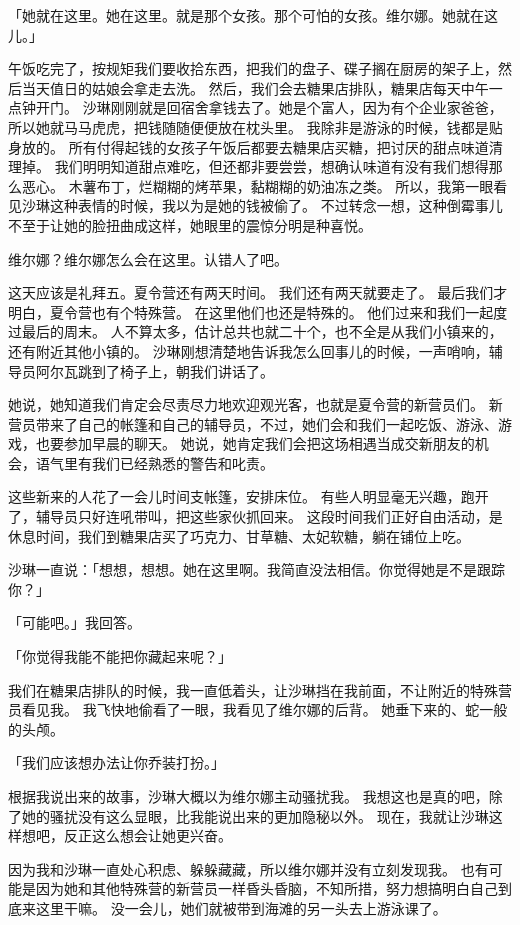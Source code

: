 \documentclass[UTF8]{ctexart}
\begin{document}
「她就在这里。她在这里。就是那个女孩。那个可怕的女孩。维尔娜。她就在这儿。」

午饭吃完了，按规矩我们要收拾东西，把我们的盘子、碟子搁在厨房的架子上，然后当天值日的姑娘会拿走去洗。
然后，我们会去糖果店排队，糖果店每天中午一点钟开门。
沙琳刚刚就是回宿舍拿钱去了。她是个富人，因为有个企业家爸爸，所以她就马马虎虎，把钱随随便便放在枕头里。
我除非是游泳的时候，钱都是贴身放的。
所有付得起钱的女孩子午饭后都要去糖果店买糖，把讨厌的甜点味道清理掉。
我们明明知道甜点难吃，但还都非要尝尝，想确认味道有没有我们想得那么恶心。
木薯布丁，烂糊糊的烤苹果，黏糊糊的奶油冻之类。
所以，我第一眼看见沙琳这种表情的时候，我以为是她的钱被偷了。
不过转念一想，这种倒霉事儿不至于让她的脸扭曲成这样，她眼里的震惊分明是种喜悦。

维尔娜？维尔娜怎么会在这里。认错人了吧。

这天应该是礼拜五。夏令营还有两天时间。
我们还有两天就要走了。
最后我们才明白，夏令营也有个特殊营。
在这里他们也还是特殊的。
他们过来和我们一起度过最后的周末。
人不算太多，估计总共也就二十个，也不全是从我们小镇来的，还有附近其他小镇的。
沙琳刚想清楚地告诉我怎么回事儿的时候，一声哨响，辅导员阿尔瓦跳到了椅子上，朝我们讲话了。

她说，她知道我们肯定会尽责尽力地欢迎观光客，也就是夏令营的新营员们。
新营员带来了自己的帐篷和自己的辅导员，不过，她们会和我们一起吃饭、游泳、游戏，也要参加早晨的聊天。
她说，她肯定我们会把这场相遇当成交新朋友的机会，语气里有我们已经熟悉的警告和叱责。

这些新来的人花了一会儿时间支帐篷，安排床位。
有些人明显毫无兴趣，跑开了，辅导员只好连吼带叫，把这些家伙抓回来。
这段时间我们正好自由活动，是休息时间，我们到糖果店买了巧克力、甘草糖、太妃软糖，躺在铺位上吃。

沙琳一直说：「想想，想想。她在这里啊。我简直没法相信。你觉得她是不是跟踪你？」

「可能吧。」我回答。

「你觉得我能不能把你藏起来呢？」

我们在糖果店排队的时候，我一直低着头，让沙琳挡在我前面，不让附近的特殊营员看见我。
我飞快地偷看了一眼，我看见了维尔娜的后背。
她垂下来的、蛇一般的头颅。

「我们应该想办法让你乔装打扮。」

根据我说出来的故事，沙琳大概以为维尔娜主动骚扰我。
我想这也是真的吧，除了她的骚扰没有这么显眼，比我能说出来的更加隐秘以外。
现在，我就让沙琳这样想吧，反正这么想会让她更兴奋。

因为我和沙琳一直处心积虑、躲躲藏藏，所以维尔娜并没有立刻发现我。
也有可能是因为她和其他特殊营的新营员一样昏头昏脑，不知所措，努力想搞明白自己到底来这里干嘛。
没一会儿，她们就被带到海滩的另一头去上游泳课了。
\end{document}
